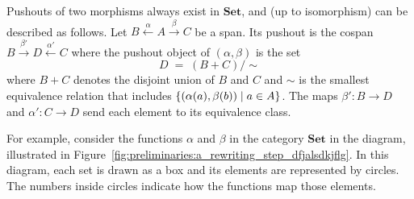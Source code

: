 \begin{example}
    \label{ex:cat:posfjsdlkgja}
     Pushouts of two morphisms always exist in \(\mathbf{Set}\), and (up to isomorphism) can be described as follows. Let
    \( B \overset{\alpha}{\leftarrow} A \overset{\beta}{\rightarrow} C \) be a span. Its pushout is the cospan \( B \overset{\beta'}{\rightarrow} D \overset{\alpha'}{\leftarrow} C \) where the pushout object of \((\alpha,\beta)\) is the set
    \[
    D \;=\; (B + C)/{\sim}
    \]
    where \(B + C\) denotes the disjoint union of $B$ and $C$ and \(\sim\) is the smallest equivalence relation that includes \(\{(\alpha(a),\beta(b))\mid a \in A \}\). The maps
    \(\beta' \colon B\to D\) and \(\alpha' \colon C\to D\) send each element to its equivalence class.

    For example, consider the functions \(\alpha\) and \(\beta\) in the category \(\mathbf{Set}\) in the diagram, illustrated in Figure~\ref{fig:preliminaries:a_rewriting_step_dfjalsdkjflg}.
    In this diagram, each set is drawn as a box and its elements are represented by circles. The numbers inside circles indicate how the functions map those elements.
    \begin{figure}[H]
      \centering 
\end{figure}
\end{example}
